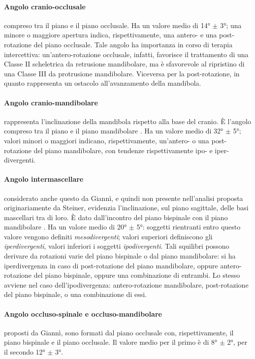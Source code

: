 \paragraph{Angolo cranio-occlusale} compreso tra il piano  e il piano occlusale. Ha un valore medio di 14° $\pm$ 3°; una minore o maggiore apertura indica, rispettivamente, una antero- e una post-rotazione del piano occlusale. Tale angolo ha importanza in corso di terapia intercettiva: un'antero-rotazione occlusale, infatti, favorisce il trattamento di una Classe II scheletrica da retrusione mandibolare, ma è sfavorevole al ripristino di una Classe III da protrusione mandibolare. Viceversa per la post-rotazione, in quanto rappresenta un ostacolo all'avanzamento della mandibola.

\paragraph{Angolo cranio-mandibolare} rappresenta l'in\-cli\-na\-zio\-ne della mandibola rispetto alla base del cranio. È l'angolo compreso tra il piano  e il piano mandibolare . Ha un valore medio di 32° $\pm$ 5°; valori minori o maggiori indicano, rispettivamente, un'antero- o una post-rotazione del piano mandibolare, con tendenze rispettivamente ipo- e iper-divergenti.

\paragraph{Angolo intermascellare} considerato anche questo da Giannì, e quindi non presente nell'analisi proposta originariamente da Steiner, evidenzia l'inclinazione, sul piano sagittale, delle basi mascellari tra di loro. È dato dall'incontro del piano bispinale  con il piano mandibolare . Ha un valore medio di 20° $\pm$ 5°: soggetti rientranti entro questo valore vengono definiti \textit{mesodivergenti}; valori superiori definiscono gli \textit{iperdivergenti}, valori inferiori i soggetti \textit{ipodivergenti}. Tali squilibri possono derivare da rotazioni varie del piano bispinale o dal piano mandibolare: si ha iperdivergenza in caso di post-rotazione del piano mandibolare, oppure antero-rotazione del piano bispinale, oppure una combinazione di entrambi. Lo stesso avviene nel caso dell'ipodivergenza: antero-rotazione mandibolare, post-rotazione del piano bispinale, o una combinazione di essi.

\paragraph{Angolo occluso-spinale e occluso-mandibolare} proposti da Giannì, sono formati dal piano occlusale con, rispettivamente, il piano bispinale e il piano occlusale. Il valore medio per il primo è di 8° $\pm$ 2°, per il secondo 12° $\pm$ 3°.

